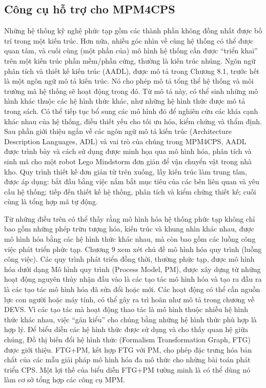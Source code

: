 \subsection{Công cụ hỗ trợ cho MPM4CPS}
Những hệ thống kỹ nghệ phức tạp gồm các thành phần không đồng nhất được bố trí trong một kiến trúc. Hơn nữa, nhiều góc nhìn về cùng hệ thống có thể được quan tâm, và cuối cùng (một phần của) mô hình hệ thống cần được ``triển khai'' trên một kiến trúc phần mềm/phần cứng, thường là kiến trúc nhúng. Ngôn ngữ phân tích và thiết kế kiến trúc (AADL), được mô tả trong Chương 8.1, trước hết là một ngôn ngữ mô tả kiến trúc. Nó cho phép mô tả tổng thể hệ thống và môi trường mà hệ thống sẽ hoạt động trong đó. Từ mô tả này, có thể sinh những mô hình khác thuộc các hệ hình thức khác, như những hệ hình thức được mô tả trong sách. Có thể tiếp tục bổ sung các mô hình đó để nghiên cứu các khía cạnh khác nhau của hệ thống, điều thiết yếu cho tối ưu hóa, kiểm chứng và thẩm định. Sau phần giới thiệu ngắn về các ngôn ngữ mô tả kiến trúc (Architecture Description Languages, ADL) và vai trò của chúng trong MPM4CPS, AADL được trình bày và cách sử dụng được minh họa qua mô hình hóa, phân tích và sinh mã cho một robot Lego Mindstorm đơn giản để vận chuyển vật trong nhà kho. Quy trình thiết kế đơn giản từ trên xuống, lấy kiến trúc làm trung tâm, được áp dụng: bắt đầu bằng việc nắm bắt mục tiêu của các bên liên quan và yêu cầu hệ thống; tiếp đến thiết kế hệ thống, phân tích và kiểm chứng thiết kế; cuối cùng là tổng hợp mã tự động.

Từ những điều trên có thể thấy rằng mô hình hóa hệ thống phức tạp không chỉ bao gồm những phép trừu tượng hóa, kiến trúc và khung nhìn khác nhau, được mô hình hóa bằng các hệ hình thức khác nhau, mà còn bao gồm các luồng công việc phát triển phức tạp. Chương 9 xem xét chủ đề mô hình hóa quy trình (luồng công việc). Các quy trình phát triển đồng thời, thường phức tạp, được mô hình hóa dưới dạng Mô hình quy trình (Process Model, PM), được xây dựng từ những hoạt động nguyên thủy nhận đầu vào là các tạo tác mô hình hóa và tạo ra đầu ra là các tạo tác mô hình hóa đã sửa đổi hoặc mới. Các hoạt động có thể cần nguồn lực con người hoặc máy tính, có thể gây ra trì hoãn như mô tả trong chương về DEVS. Vì các tạo tác mà hoạt động thao tác là mô hình thuộc nhiều hệ hình thức khác nhau, việc ``gán kiểu'' cho chúng bằng những hệ hình thức phù hợp là hợp lý. Để biểu diễn các hệ hình thức được sử dụng và cho thấy quan hệ giữa chúng, Đồ thị biến đổi hệ hình thức (Formalism Transformation Graph, FTG) được giới thiệu. FTG+PM, kết hợp FTG với PM, cho phép đặc trưng hóa bản chất của các mẫu giải pháp mô hình hóa đa mô thức cho những bài toán phát triển CPS. Một lợi thế của biểu diễn FTG+PM tường minh là có thể dùng nó làm cơ sở tổng hợp các công cụ MPM.

